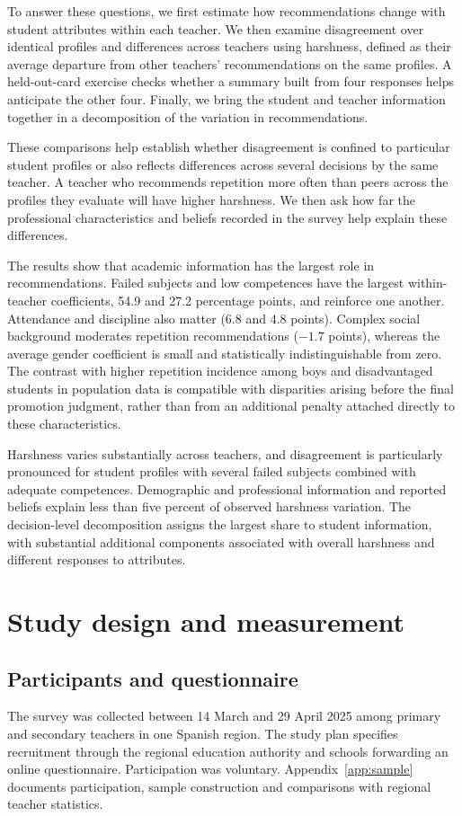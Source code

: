 To answer these questions, we first estimate how recommendations change with student attributes within each teacher. We then examine disagreement over identical profiles and differences across teachers using harshness, defined as their average departure from other teachers' recommendations on the same profiles. A held-out-card exercise checks whether a summary built from four responses helps anticipate the other four. Finally, we bring the student and teacher information together in a decomposition of the variation in recommendations.

These comparisons help establish whether disagreement is confined to particular student profiles or also reflects differences across several decisions by the same teacher. A teacher who recommends repetition more often than peers across the profiles they evaluate will have higher harshness. We then ask how far the professional characteristics and beliefs recorded in the survey help explain these differences.

The results show that academic information has the largest role in recommendations. Failed subjects and low competences have the largest within-teacher coefficients, 54.9 and 27.2 percentage points, and reinforce one another. Attendance and discipline also matter (6.8 and 4.8 points). Complex social background moderates repetition recommendations ($-1.7$ points), whereas the average gender coefficient is small and statistically indistinguishable from zero. The contrast with higher repetition incidence among boys and disadvantaged students in population data \citep{oecd} is compatible with disparities arising before the final promotion judgment, rather than from an additional penalty attached directly to these characteristics.

Harshness varies substantially across teachers, and disagreement is particularly pronounced for student profiles with several failed subjects combined with adequate competences. Demographic and professional information and reported beliefs explain less than five percent of observed harshness variation. The decision-level decomposition assigns the largest share to student information, with substantial additional components associated with overall harshness and different responses to attributes.

\section{Study design and measurement}\label{sec:design}
\subsection{Participants and questionnaire}
The survey was collected between 14 March and 29 April 2025 among primary and secondary teachers in one Spanish region. The study plan specifies recruitment through the regional education authority and schools forwarding an online questionnaire. Participation was voluntary. Appendix~\ref{app:sample} documents participation, sample construction and comparisons with regional teacher statistics.

